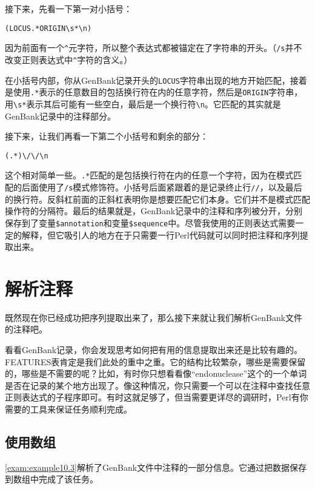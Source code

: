 接下来，先看一下第一对小括号：

\begin{lstlisting}
(LOCUS.*ORIGIN\s*\n)
\end{lstlisting}

因为前面有一个\verb|^|元字符，所以整个表达式都被锚定在了字符串的开头。（\verb|/s|并不改变正则表达式中\verb|^|字符的含义。） 

在小括号内部，你从GenBank记录开头的\verb|LOCUS|字符串出现的地方开始匹配，接着是使用\verb|.*|表示的任意数目的包括换行符在内的任意字符，然后是\verb|ORIGIN|字符串，用\verb|\s*|表示其后可能有一些空白，最后是一个换行符\verb|\n|。它匹配的其实就是GenBank记录中的注释部分。

接下来，让我们再看一下第二个小括号和剩余的部分：

\begin{lstlisting}
(.*)\/\/\n
\end{lstlisting}

这个相对简单一些。\verb|.*|匹配的是包括换行符在内的任意一个字符，因为在模式匹配的后面使用了\verb|/s|模式修饰符。小括号后面紧跟着的是记录终止行\verb|//|，以及最后的换行符。反斜杠前面的正斜杠表明你是想要匹配它们本身。它们并不是模式匹配操作符的分隔符。最后的结果就是，GenBank记录中的注释和序列被分开，分别保存到了变量\verb|$annotation|和变量\verb|$sequence|中。尽管我使用的正则表达式需要一定的解释，但它吸引人的地方在于只需要一行Perl代码就可以同时把注释和序列提取出来。

\section{解析注释}
既然现在你已经成功把序列提取出来了，那么接下来就让我们解析GenBank文件的注释吧。

看看GenBank记录，你会发现思考如何把有用的信息提取出来还是比较有趣的。FEATURES表肯定是我们此处的重中之重。它的结构比较繁杂，哪些是需要保留的，哪些是不需要的呢？比如，有时你只想看看像“endonuclease”这个的一个单词是否在记录的某个地方出现了。像这种情况，你只需要一个可以在注释中查找任意正则表达式的子程序即可。有时这就足够了，但当需要更详尽的调研时，Perl有你需要的工具来保证任务顺利完成。

\subsection{使用数组}
\autoref{exam:example10.3}解析了GenBank文件中注释的一部分信息。它通过把数据保存到数组中完成了该任务。
  


